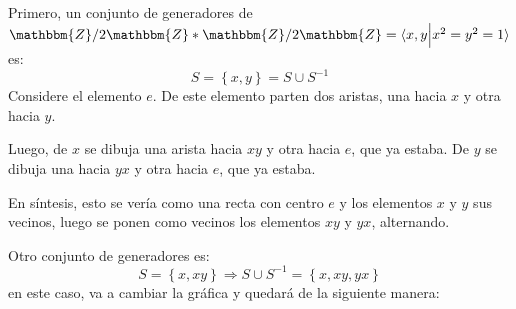 \documentclass[12pt]{report}
\theoremstyle{largebreak}
\newcommand{\bbm}[1]{\ensuremath{\mathbbm{#1}}}
\newcommand{\gen}[1]{\ensuremath{\langle#1\rangle}}
\begin{document}
    \begin{sol}
        Primero, un conjunto de generadores de $\bbm{Z}/2\bbm{Z}*\bbm{Z}/2\bbm{Z}=\gen{x,y\Big|x^2=y^2=1}$ es:
        \begin{equation*}
            S=\left\{x,y\right\}=S\cup S^{-1}
        \end{equation*}
        Considere el elemento $e$. De este elemento parten dos aristas, una hacia $x$ y otra hacia $y$.
        
        Luego, de $x$ se dibuja una arista hacia $xy$ y otra hacia $e$, que ya estaba. De $y$ se dibuja una hacia $yx$ y otra hacia $e$, que ya estaba.

        En síntesis, esto se vería como una recta con centro $e$ y los elementos $x$ y $y$ sus vecinos, luego se ponen como vecinos los elementos $xy$ y $yx$, alternando.

        \begin{center}
        \end{center}

        Otro conjunto de generadores es:
        \begin{equation*}
            S=\left\{x,xy \right\}\Rightarrow S\cup S^{-1}=\left\{x,xy,yx \right\}
        \end{equation*}
        en este caso, va a cambiar la gráfica y quedará de la siguiente manera:


\end{sol}
\end{document}
